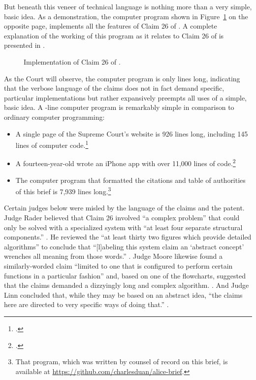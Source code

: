\documentclass{scotus}
\begin{document}
But beneath this veneer
of technical language is nothing more than a very simple, basic idea. As a
demonstration, the computer program shown in Figure~\ref{code-listing}
on the opposite page,
implements all the features of Claim 26 of .
A complete explanation of the working of
this program as it relates to Claim 26 of  is presented in
.

\def\floatpagefraction{.1}
\begin{figure}[p]
\inlinebox{\wholeprogram}%
\baselineskip
\caption{Implementation of Claim 26 of \protect{}.}
\label{code-listing}
\end{figure}

As the Court will observe, the computer program is only \numlines lines long,
indicating that
the verbose language of the claims does not in fact demand specific, particular
implementations but rather expansively preempts all uses of a simple, basic
idea. A \numlines-line computer program is remarkably simple in comparison to
ordinary computer programming:
\begin{itemize}
\item A single page of the Supreme Court's website is 926 lines long, including
145 lines of computer code.\footnote{.}
\item A fourteen-year-old wrote an iPhone app with over 11,000 lines of
code.\footnote{.}
\item The computer program that formatted the citations
and table of authorities of this brief is 7,939 lines long.\footnote{That
program, which was written by counsel of record on this brief, is available at
\url{https://github.com/charlesduan/alice-brief}.}
\end{itemize}

Certain
judges below were misled by the language of the
claims and the patent.
Judge Rader believed that Claim 26 involved
``a complex problem'' that could only be solved with a specialized system
with ``at least four separate structural components.'' . He reviewed the ``at least thirty two figures
which
provide detailed algorithms'' to conclude that ``[l]abeling
this system claim an `abstract concept' wrenches all meaning from those words.''
. Judge Moore likewise found a
similarly-worded claim ``limited to one that is configured to perform certain
functions in a particular fashion'' and, based on one of the
flowcharts, suggested that the claims demanded a dizzyingly long
and complex algorithm. . And Judge Linn
concluded that, while they may be based
on an abstract idea, ``the claims here are directed to very specific ways of
doing that.''
.
\end{document}
